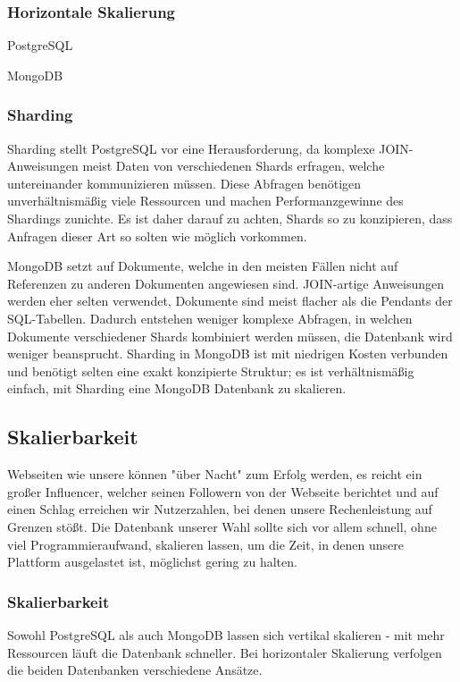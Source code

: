 \subsubsection{Horizontale Skalierung}
PostgreSQL

MongoDB

\subsubsection{Sharding}
Sharding stellt PostgreSQL vor eine Herausforderung, da komplexe JOIN-Anweisungen meist Daten von verschiedenen Shards erfragen, welche untereinander kommunizieren müssen. Diese Abfragen benötigen unverhältnismäßig viele Ressourcen und machen Performanzgewinne des Shardings zunichte. Es ist daher darauf zu achten, Shards so zu konzipieren, dass Anfragen dieser Art so solten wie möglich vorkommen.

MongoDB setzt auf Dokumente, welche in den meisten Fällen nicht auf Referenzen zu anderen Dokumenten angewiesen sind. JOIN-artige Anweisungen werden eher selten verwendet, Dokumente sind meist flacher als die Pendants der SQL-Tabellen. Dadurch entstehen weniger komplexe Abfragen, in welchen Dokumente verschiedener Shards kombiniert werden müssen, die Datenbank wird weniger beansprucht. Sharding in MongoDB ist mit niedrigen Kosten verbunden und benötigt selten eine exakt konzipierte Struktur; es ist verhältnismäßig einfach, mit Sharding eine MongoDB Datenbank zu skalieren.

\subsection{Skalierbarkeit}
Webseiten wie unsere können "über Nacht" zum Erfolg werden, es reicht ein großer Influencer, welcher seinen Followern von der Webseite berichtet und auf einen Schlag erreichen wir Nutzerzahlen, bei denen unsere Rechenleistung auf Grenzen stößt. Die Datenbank unserer Wahl sollte sich vor allem schnell, ohne viel Programmieraufwand, skalieren lassen, um die Zeit, in denen unsere Plattform ausgelastet ist, möglichst gering zu halten.
\subsubsection{Skalierbarkeit}
Sowohl PostgreSQL als auch MongoDB lassen sich vertikal skalieren - mit mehr Ressourcen läuft die Datenbank schneller. Bei horizontaler Skalierung verfolgen die beiden Datenbanken verschiedene Ansätze.
